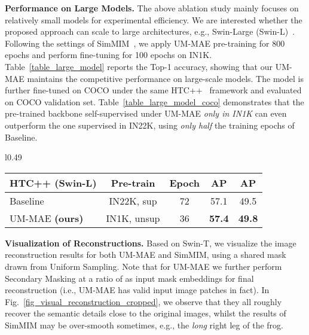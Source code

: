 \documentclass{article}
\begin{document}
\textbf{Performance on Large Models.} The above ablation study mainly focuses on relatively small models for experimental efficiency. We are interested whether the proposed approach can scale to large architectures, e.g., Swin-Large (Swin-L)~\cite{liu2021swin}. Following the settings of SimMIM~\cite{xie2021simmim}, we apply UM-MAE pre-training for 800 epochs and perform fine-tuning for 100 epochs on IN1K. 
Table~\ref{table_large_model} reports the Top-1 accuracy, showing that our UM-MAE maintains the competitive performance on large-scale models. The model is further fine-tuned on COCO under the same HTC++~\cite{chen2019hybrid,liu2021swin} framework and evaluated on COCO validation set. Table~\ref{table_large_model_coco} demonstrates that the pre-trained backbone self-supervised under UM-MAE \emph{only in IN1K} can even outperform the one supervised in IN22K, 
using \emph{only half} the training epochs of Baseline. 




\begin{wraptable}{l}{0.49\textwidth}
\begin{minipage}[ht]{0.49\textwidth}
\vspace{-10pt}
    \renewcommand\arraystretch{1.2}
    \setlength{\tabcolsep}{4.pt}
    \footnotesize
    \centering
    \resizebox{\textwidth}{!}
    {
        \begin{tabular}{l|c|c|cc}
        \hline
HTC++ (Swin-L)  & Pre-train & Epoch & AP &  AP \\\hline
        Baseline~\cite{liu2021swin}& IN22K, sup & 72  & 57.1 & 49.5 \\
        UM-MAE \textbf{(ours)}     & IN1K, unsup & 36 & \textbf{57.4} & \textbf{49.8} \\
        \hline
        \end{tabular}
    }
	\vspace{-6pt}
	\caption{\textbf{COCO Performance on large models.} The result of the Baseline refers to the paper~\cite{liu2021swin}. ``Epoch'': training schedule on COCO.
	}
\label{table_large_model_coco}
\vspace{-18pt}
\end{minipage} \vspace{12pt}
\end{wraptable}
\textbf{Visualization of Reconstructions.} Based on Swin-T, we visualize the image reconstruction results for both UM-MAE and SimMIM, using a shared mask drawn from Uniform Sampling. Note that for UM-MAE we further perform Secondary Masking at a ratio of  as input mask embeddings for final reconstruction (i.e., UM-MAE has  valid input image patches in fact). In Fig.~\ref{fig_visual_reconstruction_cropped}, we observe that they all roughly recover the semantic details close to the original images, whilst the results of SimMIM may be over-smooth sometimes, e.g., the \emph{long} right leg of the frog. 
\end{document}
